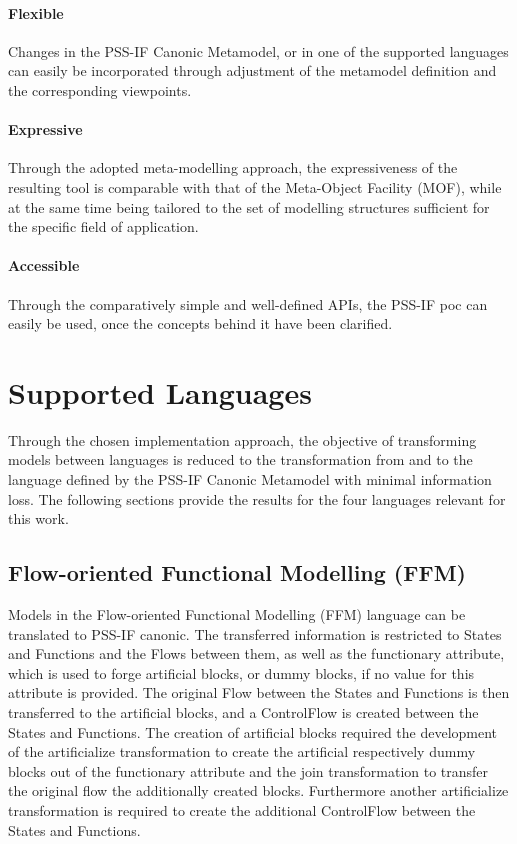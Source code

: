\paragraph{Flexible} Changes in the PSS-IF Canonic Metamodel, or in one of the supported languages can easily be incorporated through adjustment of the metamodel definition and the corresponding viewpoints.

\paragraph{Expressive} Through the adopted meta-modelling approach, the expressiveness of the resulting tool is comparable with that of the Meta-Object Facility (MOF), while at the same time being tailored to the set of modelling structures sufficient for the specific field of application.

\paragraph{Accessible} Through the comparatively simple and well-defined APIs, the PSS-IF \gls{poc} can easily be used, once the concepts behind it have been clarified.

\section{Supported Languages}
\label{sec:results:languages}

Through the chosen implementation approach, the objective of transforming models between languages is reduced to the transformation from and to the language defined by the PSS-IF Canonic Metamodel with minimal information loss. The following sections provide the results for the four languages relevant for this work.

\subsection{Flow-oriented Functional Modelling (FFM)}

Models in the Flow-oriented Functional Modelling (FFM) language can be translated to PSS-IF canonic. The transferred information is restricted to States and Functions and the Flows between them, as well as the functionary attribute, which is used to forge artificial blocks, or dummy blocks, if no value for this attribute is provided. The original Flow between the States and Functions is then transferred to the artificial blocks, and a ControlFlow is created between the States and Functions. The creation of artificial blocks required the development of the artificialize transformation to create the artificial respectively dummy blocks out of the functionary attribute and the join transformation to transfer the original flow the additionally created blocks. Furthermore another artificialize transformation is required to create the additional ControlFlow between the States and Functions.

